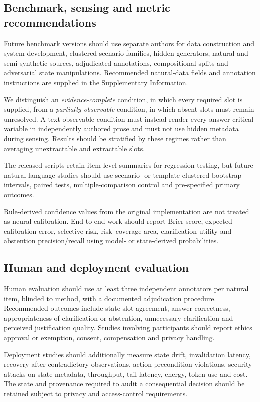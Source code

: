 \documentclass[Numbered]{sn-jnl}
\begin{document}
\subsection*{Benchmark, sensing and metric recommendations}
Future benchmark versions should use separate authors for data construction and
system development, clustered scenario families, hidden generators, natural and
semi-synthetic sources, adjudicated annotations, compositional splits and
adversarial state manipulations. Recommended natural-data fields and annotation
instructions are supplied in the Supplementary Information.

We distinguish an \emph{evidence-complete} condition, in which every required
slot is supplied, from a \emph{partially observable} condition, in which absent
slots must remain unresolved. A text-observable condition must instead render
every answer-critical variable in independently authored prose and must not use
hidden metadata during sensing. Results should be stratified by these regimes
rather than averaging unextractable and extractable slots.

The released scripts retain
item-level summaries for regression testing, but future natural-language studies
should use scenario- or template-clustered bootstrap intervals, paired tests,
multiple-comparison control and pre-specified primary outcomes.

Rule-derived confidence values from the original implementation are not treated
as neural calibration. End-to-end work should report Brier score, expected
calibration error, selective risk, risk--coverage area, clarification utility
and abstention precision/recall using model- or state-derived probabilities.

\subsection*{Human and deployment evaluation}
Human evaluation should use at least three independent annotators per natural
item, blinded to method, with a documented adjudication procedure. Recommended
outcomes include state-slot agreement, answer correctness, appropriateness of
clarification or abstention, unnecessary clarification and perceived
justification quality. Studies involving participants should report ethics
approval or exemption, consent, compensation and privacy handling.

Deployment studies should additionally measure state drift, invalidation
latency, recovery after contradictory observations, action-precondition
violations, security attacks on state metadata, throughput, tail latency,
energy, token use and cost. The state and provenance required to audit a
consequential decision should be retained subject to privacy and access-control
requirements.
\end{document}
